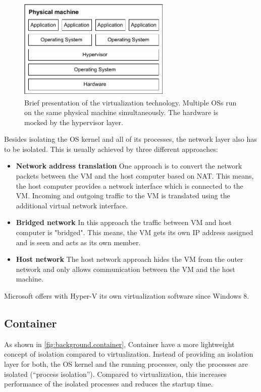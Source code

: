 \begin{figure}[h]
	\centering
	\includegraphics[width=0.65\textwidth]{Figures/virtualization.pdf}
	\caption{Brief presentation of the virtualization technology\cite{RamosApolinario.2021, Warrier.20201120}. Multiple \acp{OS} run on the same physical machine simultaneously. The hardware is mocked by the hypervisor layer.}
	\label{fig:background.virtualization}
\end{figure}

Besides isolating the \ac{OS} kernel and all of its processes, the network layer also has to be isolated. This is usually achieved by three  different approaches:
\begin{itemize}
\item \textbf{Network address translation} One approach is to convert the network packets between the \ac{VM} and the host computer based on \ac{NAT}. This means, the host computer provides a network interface which is connected to the \ac{VM}. Incoming and outgoing traffic to the \ac{VM} is translated using the additional virtual network interface. %
\item \textbf{Bridged network} In this approach the traffic between \ac{VM} and host computer is "bridged". This means, the \ac{VM} gets its own \ac{IP} address assigned and is seen and acts as its own member.
\item \textbf{Host network} The host network approach hides the \ac{VM} from the outer network and only allows communication between the \ac{VM} and the host machine.
\end{itemize}


Microsoft offers with Hyper-V its own virtualization software since Windows 8\cite{Microsoft.2013}.


\subsection{Container}
As shown in \autoref{fig:background.container}, Container have a more lightweight concept of isolation compared to virtualization. Instead of providing an isolation layer for both, the \ac{OS} kernel and the running processes, only the processes are isolated (\enquote{process isolation}). Compared to virtualization, this increases performance of the isolated processes and reduces the startup time.

